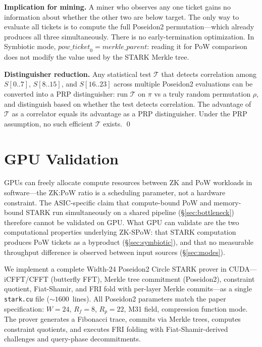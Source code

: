 \documentclass[11pt,a4paper]{article}
\begin{document}
\textbf{Implication for mining.} A miner who observes any one ticket gains no information about whether the other two are below target. The only way to evaluate all tickets is to compute the full Poseidon2 permutation---which already produces all three simultaneously. There is no early-termination optimization. In Symbiotic mode, $\mathit{pow\_ticket}_0 = \mathit{merkle\_parent}$: reading it for PoW comparison does not modify the value used by the STARK Merkle tree.

\textbf{Distinguisher reduction.} Any statistical test $\mathcal{T}$ that detects correlation among $S[0..7]$, $S[8..15]$, and $S[16..23]$ across multiple Poseidon2 evaluations can be converted into a PRP distinguisher: run $\mathcal{T}$ on $\pi$ vs a truly random permutation $\rho$, and distinguish based on whether the test detects correlation. The advantage of $\mathcal{T}$ as a correlator equals its advantage as a PRP distinguisher. Under the PRP assumption, no such efficient $\mathcal{T}$ exists. \qed

\section{GPU Validation}
\label{app:gpu}

GPUs can freely allocate compute resources between ZK and PoW workloads in software---the ZK:PoW ratio is a scheduling parameter, not a hardware constraint. The ASIC-specific claim that compute-bound PoW and memory-bound STARK run simultaneously on a shared pipeline (\S\ref{sec:bottleneck}) therefore cannot be validated on GPU. What GPU can validate are the two computational properties underlying ZK-SPoW: that STARK computation produces PoW tickets as a byproduct (\S\ref{sec:symbiotic}), and that no measurable throughput difference is observed between input sources (\S\ref{sec:modes}).

We implement a complete Width-24 Poseidon2 Circle STARK prover in CUDA---iCFFT/CFFT (butterfly FFT), Merkle tree commitment (Poseidon2), constraint quotient, Fiat-Shamir, and FRI fold with per-layer Merkle commits---as a single \texttt{stark.cu} file (${\sim}1600$~lines). All Poseidon2 parameters match the paper specification: $W=24$, $R_f=8$, $R_p=22$, M31 field, compression function mode. The prover generates a Fibonacci trace, commits via Merkle trees, computes constraint quotients, and executes FRI folding with Fiat-Shamir-derived challenges and query-phase decommitments.
\end{document}
